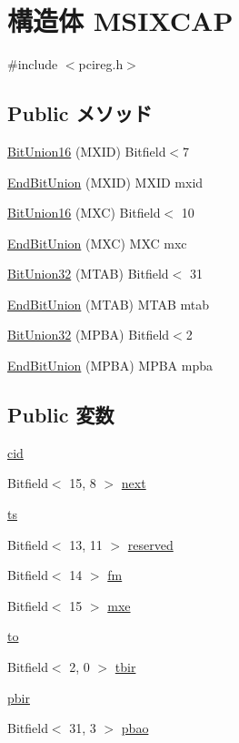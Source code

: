 \hypertarget{structMSIXCAP}{
\section{構造体 MSIXCAP}
\label{structMSIXCAP}
}


{\ttfamily \#include $<$pcireg.h$>$}\subsection*{Public メソッド}
\begin{DoxyCompactItemize}
\item 
\hyperlink{structMSIXCAP_a24a1c626a6eb63d5cc8c220e4c1a19a9}{BitUnion16} (MXID) Bitfield$<$7
\item 
\hyperlink{structMSIXCAP_ae0844b4215146f01fafb5cf3866419db}{EndBitUnion} (MXID) MXID mxid
\item 
\hyperlink{structMSIXCAP_a01055ac62b637ebd1149f3c42a831037}{BitUnion16} (MXC) Bitfield$<$ 10
\item 
\hyperlink{structMSIXCAP_a9810d14ca3ae684da01fdcdf24a742bb}{EndBitUnion} (MXC) MXC mxc
\item 
\hyperlink{structMSIXCAP_aba93f684353550c0858fcf2f298afa86}{BitUnion32} (MTAB) Bitfield$<$ 31
\item 
\hyperlink{structMSIXCAP_af772c61f7b87d3bd320882fdfadd638c}{EndBitUnion} (MTAB) MTAB mtab
\item 
\hyperlink{structMSIXCAP_a135ae3d93966ca9d846e2b30d2c1599f}{BitUnion32} (MPBA) Bitfield$<$2
\item 
\hyperlink{structMSIXCAP_ad1e6c8dc2f4b628febda333dbd8cc130}{EndBitUnion} (MPBA) MPBA mpba
\end{DoxyCompactItemize}
\subsection*{Public 変数}
\begin{DoxyCompactItemize}
\item 
\hyperlink{structMSIXCAP_abc570b1db8821b4150cc5694fb524fca}{cid}
\item 
Bitfield$<$ 15, 8 $>$ \hyperlink{structMSIXCAP_a8bb6f66c6230d47ae653bb69bad27694}{next}
\item 
\hyperlink{structMSIXCAP_a6120ebabcd02e35082049723d85f6a08}{ts}
\item 
Bitfield$<$ 13, 11 $>$ \hyperlink{structMSIXCAP_aadbed79dd56043a78ec3b3ccffcdef8d}{reserved}
\item 
Bitfield$<$ 14 $>$ \hyperlink{structMSIXCAP_ade618898ce6f55c59d2a5cf5d0adc831}{fm}
\item 
Bitfield$<$ 15 $>$ \hyperlink{structMSIXCAP_aa871ae1b501989a7862cb2a464c23c9c}{mxe}
\item 
\hyperlink{structMSIXCAP_af71dbe52628a3f83a77ab494817525c6}{to}
\item 
Bitfield$<$ 2, 0 $>$ \hyperlink{structMSIXCAP_acc4aae2fdf3fbb9db959cfc4e68b64fc}{tbir}
\item 
\hyperlink{structMSIXCAP_a76f961f9cc6a001f23cf3d00aedbed48}{pbir}
\item 
Bitfield$<$ 31, 3 $>$ \hyperlink{structMSIXCAP_ac032390f9b39ac6258a668aab11577e8}{pbao}
\end{DoxyCompactItemize}


